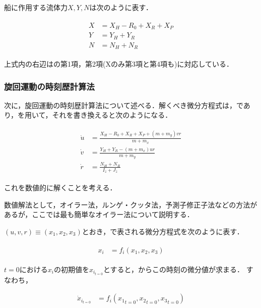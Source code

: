 船に作用する流体力$X,Y,N$は次のように表す．

\begin{align}
    \begin{split}
        X &= X_H - R_0 + X_R + X_P \\
        Y &= Y_H + Y_R \\
        N &= N_H + N_R \label{eq:2-52}
    \end{split}
\end{align}

上式内の右辺はの第1項，第2項(Xのみ第3項と第4項も)に対応している．

\subsubsection{旋回運動の時刻歴計算法}

次に，旋回運動の時刻歴計算法について述べる．解くべき微分方程式は，であり，を用いて，それを書き換えると次のようになる．

\begin{align}
    \begin{split}
        \dot{u} &= \frac{X_H - R_0 + X_R + X_P + (m + m_y) v r}{m + m_x} \\
        \dot{v} &= \frac{Y_H + Y_R - (m + m_x) u r}{m + m_y} \\
        \dot{r} &= \frac{N_H + N_R}{I_z + J_z} \label{eq:2-53}
    \end{split}
\end{align}

これを数値的に解くことを考える．

数値解法として，オイラー法，ルンゲ・クッタ法，予測子修正子法などの方法があるが，ここでは最も簡単なオイラー法について説明する．

$(u,v,r)\equiv(x_1,x_2,x_3)$とおき，で表される微分方程式を次のように表す．

\begin{align}
    \begin{split}
        x_i &= f_i(x_1, x_2, x_3) \label{eq:2-54}
    \end{split}
\end{align}

$t=0$における$x_i$の初期値を$x_{i_{t=0}}$とすると，からこの時刻の微分値が求まる．
すなわち，

\begin{align}
    \dot{x}_{i_{t=0}} &= f_i({x_1}_{t=0}, {x_2}_{t=0}, {x_3}_{t=0}) \label{eq:2-55}
\end{align}

